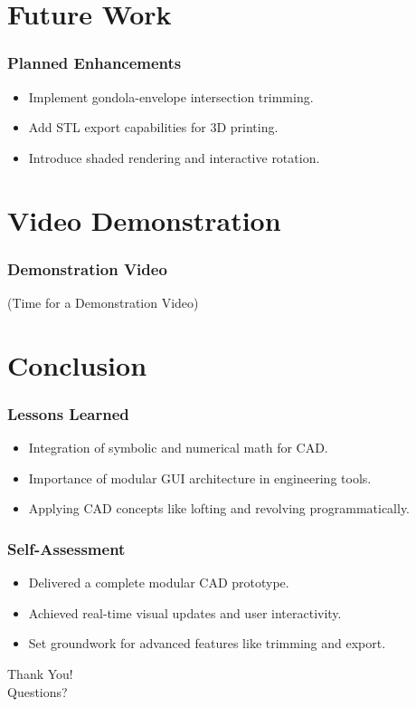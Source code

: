 \documentclass{beamer}
\begin{document}
\section{Future Work}
\begin{frame}
    \frametitle{Planned Enhancements}
    \begin{itemize}
        \item Implement gondola-envelope intersection trimming.
        \item Add STL export capabilities for 3D printing.
        \item Introduce shaded rendering and interactive rotation.
    \end{itemize}
\end{frame}

\section{Video Demonstration}
\begin{frame}
    \frametitle{Demonstration Video}
    \centering
    (Time for a Demonstration Video)
\end{frame}


\section{Conclusion}
\begin{frame}
    \frametitle{Lessons Learned}
    \begin{itemize}
        \item Integration of symbolic and numerical math for CAD.
        \item Importance of modular GUI architecture in engineering tools.
        \item Applying CAD concepts like lofting and revolving programmatically.
    \end{itemize}
\end{frame}

\begin{frame}
    \frametitle{Self-Assessment}
    \begin{itemize}
        \item Delivered a complete modular CAD prototype.
        \item Achieved real-time visual updates and user interactivity.
        \item Set groundwork for advanced features like trimming and export.
    \end{itemize}
\end{frame}

\begin{frame}[plain]
    \centering
    \Huge Thank You!\\
    \vspace{0.5cm}
    \Large Questions?
\end{frame}
\end{document}
